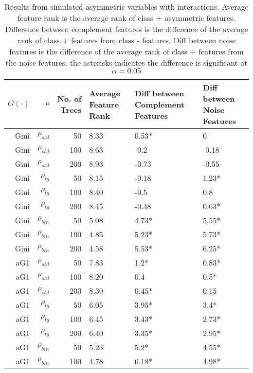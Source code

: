\documentclass[twoside,11pt]{article}
\begin{document}
\begin{table}%
  \centering
  \caption{Results from simulated asymmetric variables with interactions. Average feature rank is the average rank of class + asymmetric features. Difference between complement features is the difference of the average rank of class + features from class - features. Diff between noise features is the difference of the average rank of class + features from the noise features. the asterisks indicates the difference is significant at $\alpha=0.05$ }
\begin{tabular}{rrrp{2.5cm}p{2.5cm}p{2.5cm}}
\hline
$G(\cdot)$ & $\rho$ & No. of Trees & Average Feature Rank & Diff between Complement Features & Diff between Noise Features \bigstrut\\
\hline
\renewcommand{\arraystretch}{.5}
Gini     & $\rho_{std}$ & 50    & 8.33  & 0.53* & 0 \bigstrut[t]\\
Gini     & $\rho_{std}$ & 100   & 8.63  & -0.2  & -0.18 \\
Gini     & $\rho_{std}$ & 200   & 8.93  & -0.73 & -0.55 \bigstrut[b]\\
\hline
Gini     & $\rho_{lg}$ & 50    & 8.15  & -0.18 & 1.23* \bigstrut[t]\\
Gini     & $\rho_{lg}$ & 100   & 8.40  & -0.5  & 0.8 \\
Gini     & $\rho_{lg}$ & 200   & 8.45  & -0.48 & 0.63* \bigstrut[b]\\
\hline
Gini     & $\rho_{bin}$ & 50    & 5.08  & 4.73* & 5.55* \bigstrut[t]\\
Gini     & $\rho_{bin}$ & 100   & 4.85  & 5.23* & 5.73* \\
Gini     & $\rho_{bin}$ & 200   & 4.58  & 5.53* & 6.25* \bigstrut[b]\\
\hline
aG1   & $\rho_{std}$ & 50    & 7.83  & 1.2*  & 0.83* \bigstrut[t]\\
aG1   & $\rho_{std}$ & 100   & 8.20  & 0.4   & 0.5* \\
aG1   & $\rho_{std}$ & 200   & 8.30  & 0.45* & 0.15 \bigstrut[b]\\
\hline
aG1   & $\rho_{lg}$ & 50    & 6.05  & 3.95* & 3.4* \bigstrut[t]\\
aG1   & $\rho_{lg}$ & 100   & 6.45  & 3.43* & 2.73* \\
aG1   & $\rho_{lg}$ & 200   & 6.40  & 3.35* & 2.95* \bigstrut[b]\\
\hline
aG1   & $\rho_{bin}$ & 50    & 5.23  & 5.2*  & 4.55* \bigstrut[t]\\
aG1   & $\rho_{bin}$ & 100   & 4.78  & 6.18* & 4.98* \\

\end{tabular}
\end{table}
\end{document}
